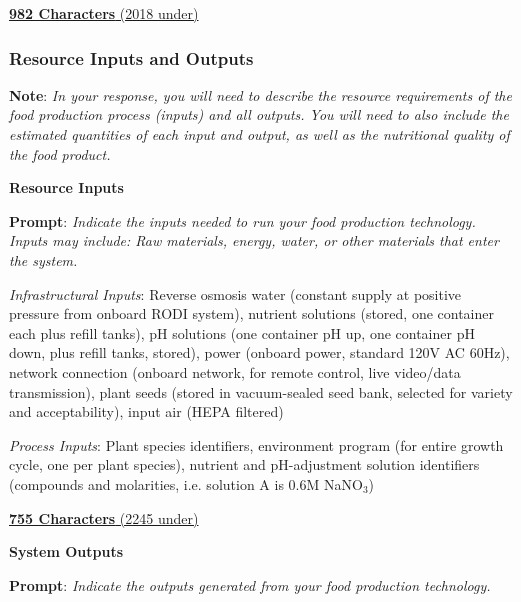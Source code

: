 \documentclass{report}
\begin{document}
\uline{\textbf{982 Characters} (2018 under)}


\subsubsection{Resource Inputs and Outputs}
\label{sec:resource}

\textbf{Note}: \textit{In your response, you will need to describe the resource requirements of the food production process (inputs) and all outputs. You will need to also include the estimated quantities of each input and output, as well as the nutritional quality of the food product.}

\textbf{Resource Inputs}
\label{sec:resource-inputs}

\textbf{Prompt}: \textit{Indicate the inputs needed to run your food production technology. Inputs may include: Raw materials, energy, water, or other materials that enter the system.}


\textit{Infrastructural Inputs}: Reverse osmosis water (constant supply at positive pressure from onboard RODI system), nutrient solutions (stored, one container each plus refill tanks), pH solutions (one container pH up, one container pH down, plus refill tanks, stored), power (onboard power, standard 120V AC 60Hz), network connection (onboard network, for remote control, live video/data transmission), plant seeds (stored in vacuum-sealed seed bank, selected for variety and acceptability), input air (HEPA filtered)

\textit{Process Inputs}: Plant species identifiers, environment program (for entire growth cycle, one per plant species), nutrient and pH-adjustment solution identifiers (compounds and molarities, i.e. solution A is 0.6M NaNO${}_3$)

\uline{\textbf{755 Characters} (2245 under)}


\textbf{System Outputs}
\label{sec:resource-outputs}

\textbf{Prompt}: \textit{Indicate the outputs generated from your food production technology. }

\end{document}
